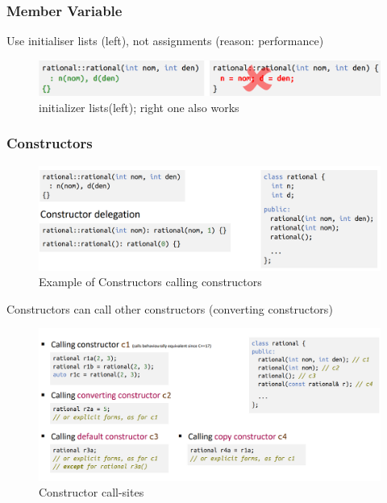 \documentclass[a4paper,10pt]{article}
\begin{document}
\subsubsection{Member Variable}
    Use initialiser lists (left), not assignments (reason: performance)
    \begin{figure}[h]
        \centering
        \includegraphics[width=1\linewidth]{e10.png}
        \caption{initializer lists(left); right one also works}
        \label{fig:enter-label}
    \end{figure}

\pagebreak
\subsubsection{Constructors}
\begin{figure}[h]
    \centering
    \includegraphics[width=1\linewidth]{e12.png}
    \caption{Example of Constructors calling constructors}
    \label{fig:enter-label}
\end{figure}
Constructors can call other constructors (converting constructors)
\begin{figure}[h]
    \centering
    \includegraphics[width=1\linewidth]{e11.png}
    \caption{Constructor call-sites}
    \label{fig:enter-label}
\end{figure}
\end{document}
